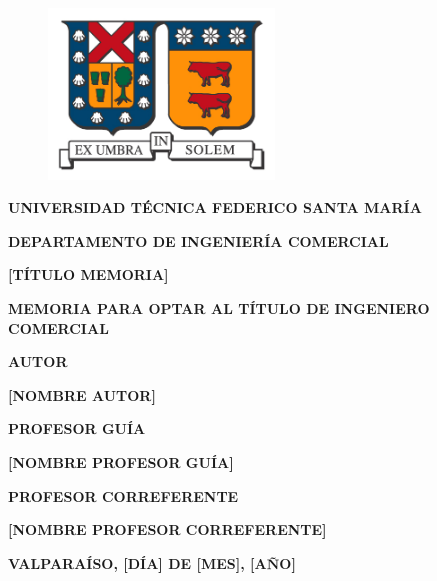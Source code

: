 \documentclass[letterpaper,11pt,oneside]{article}
\begin{document}
\renewcommand\contentsname{ÍNDICE}

\renewcommand{\listtablename}{ÍNDICE DE TABLAS}

\renewcommand{\listfigurename}{ÍNDICE DE ILUSTRACIONES}

\renewcommand\refname{REFERENCIAS}

\renewcommand{\tablename}{Tabla}

\renewcommand*{\tableautorefname}{Tabla}

\renewcommand{\figurename}{Figura}

\renewcommand*{\figureautorefname}{Figura}

\renewcommand*{\equationautorefname}{Ecuación}

\begin{titlepage}
    \centering
	\begin{figure}[htb]
	    \centering
		\includegraphics[width=6cm]{logo_usm1}
	\end{figure}
	{\textbf{UNIVERSIDAD TÉCNICA FEDERICO SANTA MARÍA} \par}
	{\textbf{DEPARTAMENTO DE INGENIERÍA COMERCIAL} \par}
    \vspace{1cm}
	{\textbf{[TÍTULO MEMORIA]} \par}
	\vspace{1cm}
	{\textbf{MEMORIA PARA OPTAR AL TÍTULO DE INGENIERO COMERCIAL} \par}
	\vspace{1cm}
	{\textbf{AUTOR} \par}
	{\textbf{[NOMBRE AUTOR]} \par}
	\vspace{1cm}
	{\textbf{PROFESOR GUÍA} \par} 
	{\textbf{[NOMBRE PROFESOR GUÍA]} \par}
	\vspace{1cm}
	{\textbf{PROFESOR CORREFERENTE} \par}
	{\textbf{[NOMBRE PROFESOR CORREFERENTE]} \par}
	\vfill
	{\textbf{VALPARAÍSO, [DÍA] DE [MES], [AÑO]} \par}
\end{titlepage}
\end{document}
